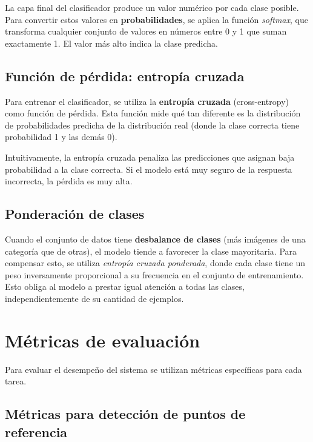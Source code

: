 La capa final del clasificador produce un valor numérico por cada clase posible. Para convertir estos valores en \textbf{probabilidades}, se aplica la función \textit{softmax}, que transforma cualquier conjunto de valores en números entre 0 y 1 que suman exactamente 1. El valor más alto indica la clase predicha.

\subsection{Función de pérdida: entropía cruzada}

Para entrenar el clasificador, se utiliza la \textbf{entropía cruzada} (cross-entropy) como función de pérdida. Esta función mide qué tan diferente es la distribución de probabilidades predicha de la distribución real (donde la clase correcta tiene probabilidad 1 y las demás 0).

Intuitivamente, la entropía cruzada penaliza las predicciones que asignan baja probabilidad a la clase correcta. Si el modelo está muy seguro de la respuesta incorrecta, la pérdida es muy alta.

\subsection{Ponderación de clases}

Cuando el conjunto de datos tiene \textbf{desbalance de clases} (más imágenes de una categoría que de otras), el modelo tiende a favorecer la clase mayoritaria. Para compensar esto, se utiliza \textit{entropía cruzada ponderada}, donde cada clase tiene un peso inversamente proporcional a su frecuencia en el conjunto de entrenamiento. Esto obliga al modelo a prestar igual atención a todas las clases, independientemente de su cantidad de ejemplos.

\section{Métricas de evaluación}
\label{sec:metricas}

Para evaluar el desempeño del sistema se utilizan métricas específicas para cada tarea.

\subsection{Métricas para detección de puntos de referencia}

